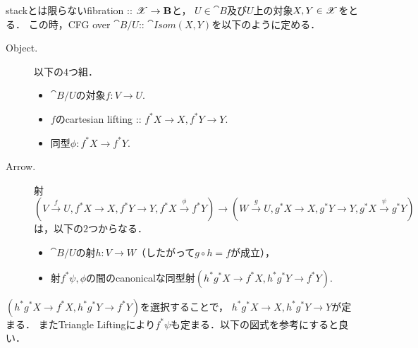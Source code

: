 \documentclass[a4paper, dvipdfmx]{jsarticle}
\newcommand{\Isom}{\cat{Isom}}
\begin{document}
\begin{Def}[$\Isom(X, Y)$]
    stackとは限らないfibration :: $\mathscr{X} \to \mathbf{B}$と，
    $U \in \cat{B}$及び$U$上の対象$X, Y \in \mathscr{X}$をとる．
    この時，CFG over $\cat{B}/U$:: $\Isom(X, Y)$を以下のように定める．
    \begin{description}
        \item[Object.]
            以下の$4$つ組．
            \begin{itemize}
                \item $\cat{B}/U$の対象$f \colon V \to U$.
                \item $f$のcartesian lifting :: $f^*X \to X, f^*Y \to Y$.
                \item 同型$\phi \colon f^*X \to f^*Y$.
            \end{itemize}

        \item[Arrow.]
            射
            \[
                (V \xrightarrow{f} U, f^*X \to X, f^*Y \to Y, f^*X \xrightarrow{\phi} f^*Y)
                \to
                (W \xrightarrow{g} U, g^*X \to X, g^*Y \to Y, g^*X \xrightarrow{\psi} g^*Y)
            \]
            は，以下の$2$つからなる．
            \begin{itemize}
                \item $\cat{B}/U$の射$h \colon V \to W$（したがって$g \circ h=f$が成立），
                \item 射$f^*\psi, \phi$の間のcanonicalな同型射$(h^*g^*X \to f^*X, h^*g^*Y \to f^*Y)$.
            \end{itemize}
    \end{description}
    $(h^*g^*X \to f^*X, h^*g^*Y \to f^*Y)$を選択することで，
    $h^*g^*X \to X, h^*g^*Y \to Y$が定まる．
    またTriangle Liftingにより$f^*\psi$も定まる．以下の図式を参考にすると良い．
    \begin{center}
\end{center}
\end{Def}
\end{document}
